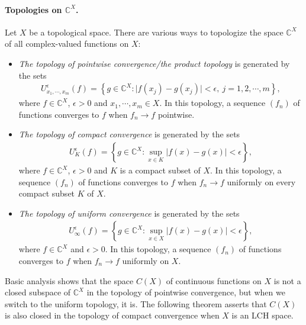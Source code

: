 \documentclass{article}
\numberwithin{equation}{section}
\newcommand{\bbC}{\mathbb{C}}
\theoremstyle{plain}
\theoremstyle{definition}
\begin{document}
\paragraph{Topologies on $\bbC^X$.} Let $X$ be a topological space. There are various ways to topologize the space $\bbC^X$ of all complex-valued functions on $X$:
\begin{itemize}
	\item\textit{The topology of pointwise convergence/the product topology} is generated by the sets
	\begin{align*}
		U_{x_1,\cdots,x_m}^\epsilon(f)=\left\{g\in\bbC^X:\vert f(x_j)-g(x_j)\vert<\epsilon,\ j=1,2,\cdots,m\right\},
	\end{align*}
	where $f\in\bbC^X$, $\epsilon>0$ and $x_1,\cdots,x_m\in X$. In this topology, a sequence $(f_n)$ of functions converges to $f$ when $f_n\to f$ pointwise.
	\item\textit{The topology of compact convergence} is generated by the sets
	\begin{align*}
		U_K^\epsilon(f)=\left\{g\in\bbC^X:\sup_{x\in K}\vert f(x)-g(x)\vert<\epsilon\right\},
	\end{align*}
	where $f\in\bbC^X$, $\epsilon>0$ and $K$ is a compact subset of $X$. In this topology, a sequence $(f_n)$ of functions converges to $f$ when $f_n\to f$ uniformly on every compact subset $K$ of $X$.
	\item\textit{The topology of uniform convergence} is generated by the sets
	\begin{align*}
		U_\infty^\epsilon(f)=\left\{g\in\bbC^X:\sup_{x\in X}\vert f(x)-g(x)\vert<\epsilon\right\},
	\end{align*}
	where $f\in\bbC^X$ and $\epsilon>0$. In this topology, a sequence $(f_n)$ of functions converges to $f$ when $f_n\to f$ uniformly on $X$.
\end{itemize}

Basic analysis shows that the space $C(X)$ of continuous functions on $X$ is not a closed subspace of $\bbC^X$ in the topology of pointwise convergence, but when we switch to the uniform topology, it is. The following theorem asserts that $C(X)$ is also closed in the topology of compact convergence when $X$ is an LCH space.
\end{document}
